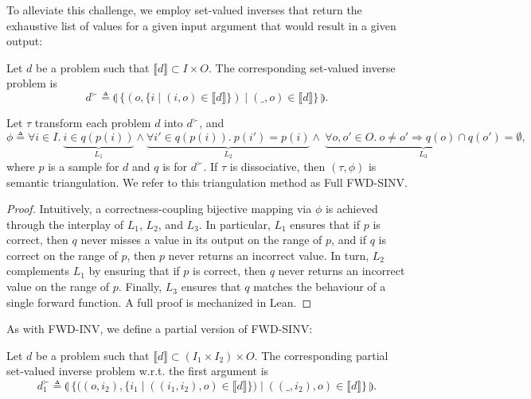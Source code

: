 \documentclass[acmsmall,screen,nonacm]{acmart}
\begin{document}
To alleviate this challenge, we employ set-valued inverses that return the exhaustive list of values for a given input argument that would result in a given output:

\begin{definition}
  Let $d$ be a problem such that $\llbracket d \rrbracket\subset I\times O$. The corresponding set-valued inverse problem is $$d^{\succ} \triangleq \llparenthesis\ \bigl\{(o, \{i \mid (i, o) \in \llbracket d \rrbracket \}) \mid (\_, o) \in \llbracket d \rrbracket \bigr\}\ \rrparenthesis.$$
\end{definition}

\begin{proposition}\label{prop:full_fwd_sinv}
  Let $\tau$ transform each problem $d$ into $d^{\succ}$, and $$\phi\triangleq \forall i \in I.\ \underbrace{i \in q(p(i))}_{L_1} \wedge \underbrace{\forall i' \in q(p(i)).\ p(i') = p(i)}_{L_2} \wedge\ \underbrace{\forall o, o'\in O.\ o \neq o' \Rightarrow q(o) \cap q(o') = \emptyset}_{L_3},$$ where $p$ is a sample for $d$ and $q$ is for $d^{\succ}$. If $\tau$ is dissociative, then $(\tau, \phi)$ is semantic triangulation. We refer to this triangulation method as Full FWD-SINV.
\end{proposition}

\begin{proof}
  Intuitively, a correctness-coupling bijective mapping via $\phi$ is achieved through the interplay of $L_1$, $L_2$, and $L_3$. In particular, $L_1$ ensures that if $p$ is correct, then $q$ never misses a value in its output on the range of $p$, and if $q$ is correct on the range of $p$, then $p$ never returns an incorrect value. In turn, $L_2$ complements $L_1$ by ensuring that if $p$ is correct, then $q$ never returns an incorrect value on the range of $p$. Finally, $L_3$ ensures that $q$ matches the behaviour of a single forward function. A full proof is mechanized in Lean.
\end{proof}


As with FWD-INV, we define a partial version of FWD-SINV:

\begin{definition}
  Let $d$ be a problem such that $\llbracket d \rrbracket\subset (I_1 \times I_2) \times O$. The corresponding partial set-valued inverse problem w.r.t. the first argument is $$d^{\succ}_1 \triangleq \llparenthesis\ \bigl\{\bigl((o, i_2), \{i_1 \mid ((i_1, i_2), o) \in \llbracket d \rrbracket \}\bigr) \mid ((\_, i_2), o) \in \llbracket d \rrbracket \bigr\}\ \rrparenthesis.$$
\end{definition}
\end{document}

